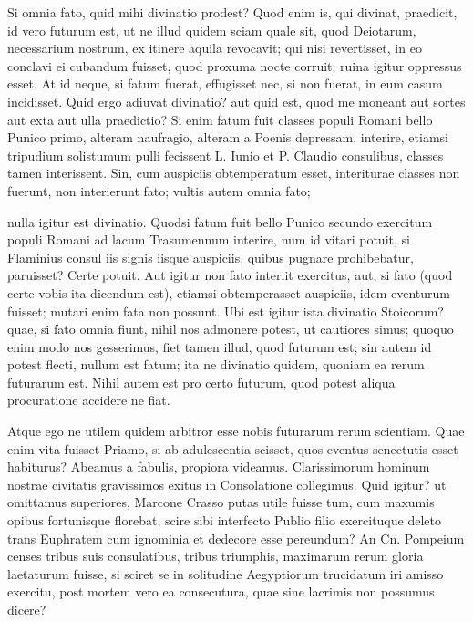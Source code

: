  Si omnia fato, quid mihi divinatio prodest? Quod enim is, qui divinat, praedicit, id vero futurum est, ut ne illud quidem sciam quale sit, quod Deiotarum, necessarium nostrum, ex itinere aquila revocavit; qui nisi revertisset, in eo conclavi ei cubandum fuisset, quod proxuma nocte corruit; ruina igitur oppressus esset. At id neque, si fatum fuerat, effugisset nec, si non fuerat, in eum casum incidisset. Quid ergo adiuvat divinatio? aut quid est, quod me moneant aut sortes aut exta aut ulla praedictio? Si enim fatum fuit classes populi Romani bello Punico primo, alteram naufragio, alteram a Poenis depressam, interire, etiamsi tripudium solistumum pulli fecissent L. Iunio et P. Claudio consulibus, classes tamen interissent. Sin, cum auspiciis obtemperatum esset, interiturae classes non fuerunt, non interierunt fato; vultis autem omnia fato;

 nulla igitur est divinatio. Quodsi fatum fuit bello Punico secundo exercitum populi Romani ad lacum Trasumennum interire, num id vitari potuit, si Flaminius consul iis signis iisque auspiciis, quibus pugnare prohibebatur, paruisset? Certe potuit. Aut igitur non fato interiit exercitus, aut, si fato (quod certe vobis ita dicendum est), etiamsi obtemperasset auspiciis, idem eventurum fuisset; mutari enim fata non possunt. Ubi est igitur ista divinatio Stoicorum? quae, si fato omnia fiunt, nihil nos admonere potest, ut cautiores simus; quoquo enim modo nos gesserimus, fiet tamen illud, quod futurum est; sin autem id potest flecti, nullum est fatum; ita ne divinatio quidem, quoniam ea rerum futurarum est. Nihil autem est pro certo futurum, quod potest aliqua procuratione accidere ne fiat.

 Atque ego ne utilem quidem arbitror esse nobis futurarum rerum scientiam. Quae enim vita fuisset Priamo, si ab adulescentia scisset, quos eventus senectutis esset habiturus? Abeamus a fabulis, propiora videamus. Clarissimorum hominum nostrae civitatis gravissimos exitus in Consolatione collegimus. Quid igitur? ut omittamus superiores, Marcone Crasso putas utile fuisse tum, cum maxumis opibus fortunisque florebat, scire sibi interfecto Publio filio exercituque deleto trans Euphratem cum ignominia et dedecore esse pereundum? An Cn. Pompeium censes tribus suis consulatibus, tribus triumphis, maximarum rerum gloria laetaturum fuisse, si sciret se in solitudine Aegyptiorum trucidatum iri amisso exercitu, post mortem vero ea consecutura, quae sine lacrimis non possumus dicere?

